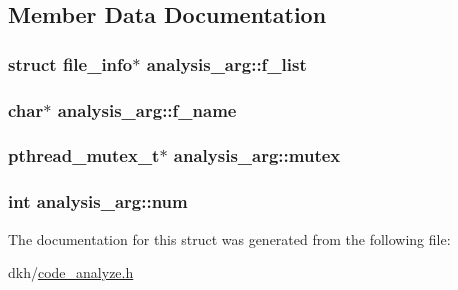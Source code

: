 \subsection{Member Data Documentation}
\hypertarget{structanalysis__arg_a06dce9c50b6212f9fd620d149adc5734}{
\subsubsection[{f\+\_\+list}]{\setlength{\rightskip}{0pt plus 5cm}struct {\bf file\+\_\+info}$\ast$ analysis\+\_\+arg\+::f\+\_\+list}}\label{structanalysis__arg_a06dce9c50b6212f9fd620d149adc5734}
\hypertarget{structanalysis__arg_ae4dc80fc7340c819c3315324b1c24511}{
\subsubsection[{f\+\_\+name}]{\setlength{\rightskip}{0pt plus 5cm}char$\ast$ analysis\+\_\+arg\+::f\+\_\+name}}\label{structanalysis__arg_ae4dc80fc7340c819c3315324b1c24511}
\hypertarget{structanalysis__arg_a5af66e583b346de25aee6ab4acaa91a7}{
\subsubsection[{mutex}]{\setlength{\rightskip}{0pt plus 5cm}pthread\+\_\+mutex\+\_\+t$\ast$ analysis\+\_\+arg\+::mutex}}\label{structanalysis__arg_a5af66e583b346de25aee6ab4acaa91a7}
\hypertarget{structanalysis__arg_af120d208cb66f64281db9ccd6f2f6afc}{
\subsubsection[{num}]{\setlength{\rightskip}{0pt plus 5cm}int analysis\+\_\+arg\+::num}}\label{structanalysis__arg_af120d208cb66f64281db9ccd6f2f6afc}


The documentation for this struct was generated from the following file\+:\begin{DoxyCompactItemize}
\item 
dkh/\hyperlink{code__analyze_8h}{code\+\_\+analyze.\+h}\end{DoxyCompactItemize}
